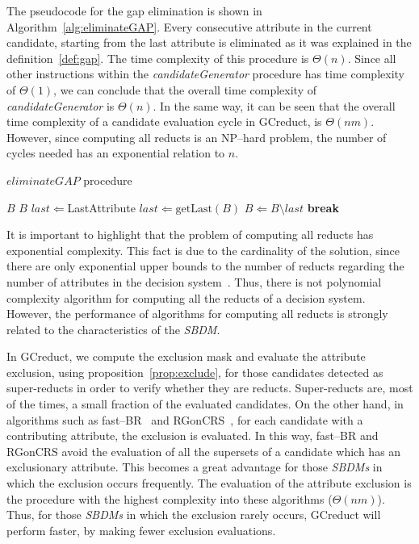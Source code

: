 \documentclass[number,preprint,review,12pt]{elsarticle}
\begin{document}
	The pseudocode for the gap elimination is shown in Algorithm~\ref{alg:eliminateGAP}. Every consecutive attribute in the current candidate, starting from the last attribute is eliminated as it was explained in the definition~\ref{def:gap}. The time complexity of this procedure is $\Theta(n)$. Since all other instructions within the \textit{candidateGenerator} procedure has time complexity of $\Theta(1)$, we can conclude that the overall time complexity of \textit{candidateGenerator} is $\Theta(n)$. In the same way, it can be seen that the overall time complexity of a candidate evaluation cycle in GCreduct, is $\Theta(nm)$. However, since computing all reducts is an NP--hard problem, the number of cycles needed has an exponential relation to $n$.

	\begin{algorithm}
		\footnotesize
		\caption{$eliminateGAP$ procedure}
		\label{alg:eliminateGAP}
		\begin{algorithmic}[1]	
			\Require \textit{$B$}
			\Ensure $B$ 
			\State $last \Leftarrow $LastAttribute
			\State $last \Leftarrow \mathrm{getLast}(B)$
			\State $B \Leftarrow B\setminus last$
			\State \textbf{break}\label{line:gapEnd}
			\EndIf
			\EndWhile
		\end{algorithmic}
	\end{algorithm}
		
	It is important to highlight that the problem of computing all reducts has exponential complexity. This fact is due to the cardinality of the solution, since there are only exponential upper bounds to the number of reducts regarding the number of attributes in the decision system~\cite{Skowron92}. Thus, there is not  polynomial complexity algorithm for computing all the reducts of a decision system. However, the performance of algorithms for computing all reducts is strongly related to the characteristics of the \textit{SBDM}. 
	
	\label{par:complexity}
	In GCreduct, we compute the exclusion mask and evaluate the attribute exclusion, using proposition~\ref{prop:exclude}, for those candidates detected as super-reducts in order to verify whether they are reducts. Super-reducts are, most of the times, a small fraction of the evaluated candidates. On the other hand, in algorithms such as fast--BR~\cite{Lias13} and RGonCRS~\cite{WangP07}, for each candidate with a contributing attribute, the exclusion is evaluated. In this way, fast--BR and RGonCRS avoid the evaluation of all the supersets of a candidate which has an exclusionary attribute. This becomes a great advantage for those \textit{SBDMs} in which the exclusion occurs frequently. The evaluation of the attribute exclusion is the procedure with the highest complexity into these algorithms ($\Theta (nm)$). Thus, for those \textit{SBDMs} in which the exclusion rarely occurs, GCreduct will perform faster, by making fewer exclusion evaluations.
	
\end{document}
